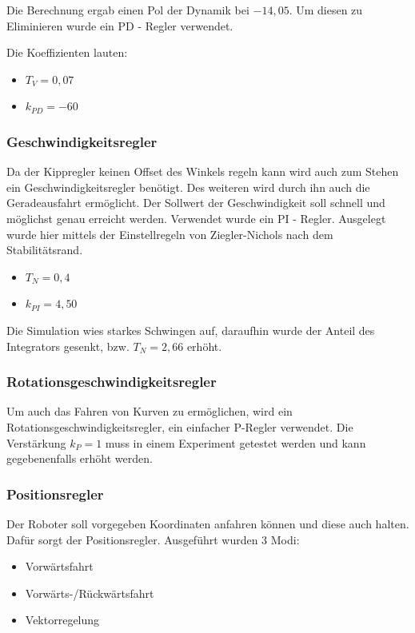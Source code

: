 Die Berechnung ergab einen Pol der Dynamik bei $-14,05$. Um diesen zu Eliminieren wurde ein PD - Regler verwendet.

Die Koeffizienten lauten:
\begin{itemize}
	\item $ T_{V}=0,07$
	\item $ k_{PD}=-60$
\end{itemize}
\subsubsection{Geschwindigkeitsregler}
Da der Kippregler keinen Offset des Winkels regeln kann wird auch zum Stehen ein Geschwindigkeitsregler benötigt. Des weiteren wird durch ihn auch die Geradeausfahrt ermöglicht. Der Sollwert der Geschwindigkeit soll schnell und möglichst genau erreicht werden.
Verwendet wurde ein PI - Regler. Ausgelegt wurde hier mittels der Einstellregeln von Ziegler-Nichols nach dem Stabilitätsrand.
\begin{itemize}
	\item $ T_{N}=0,4$
	\item $ k_{PI}=4,50$
\end{itemize}
Die Simulation wies starkes Schwingen auf, daraufhin wurde der Anteil des Integrators gesenkt, bzw. $ T_{N}=2,66$ erhöht.
\subsubsection{Rotationsgeschwindigkeitsregler}
Um auch das Fahren von Kurven zu ermöglichen, wird ein Rotationsgeschwindigkeitsregler, ein einfacher P-Regler verwendet. Die Verstärkung $k_{P}=1$ muss in einem Experiment getestet werden und kann gegebenenfalls erhöht werden.
\subsubsection{Positionsregler}
Der Roboter soll vorgegeben Koordinaten anfahren können und  diese auch halten. Dafür sorgt der Positionsregler. Ausgeführt wurden 3 Modi:
\begin{itemize}
	\item Vorwärtsfahrt
	\item Vorwärts-/Rückwärtsfahrt
	\item Vektorregelung
\end{itemize}

